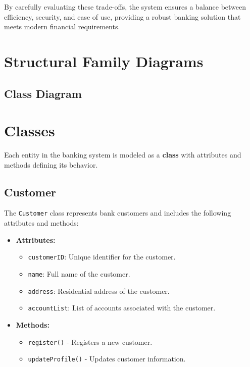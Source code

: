 By carefully evaluating these trade-offs, the system ensures a balance
between efficiency, security, and ease of use, providing a robust
banking solution that meets modern financial requirements.

\section{\texorpdfstring{Structural Family Diagrams
}{Structural Family Diagrams }}\label{structural-family-diagrams}

\subsection{Class Diagram}\label{class-diagram}

\section{\texorpdfstring{ Classes}{ Classes}}\label{classes}

Each entity in the banking system is modeled as a \textbf{class} with
attributes and methods defining its behavior.

\subsection{Customer}\label{customer}

The \texttt{Customer} class represents bank customers and includes the
following attributes and methods:

\begin{itemize}
\item
  \textbf{Attributes:}

  \begin{itemize}
  \item
    \texttt{customerID}: Unique identifier for the customer.
  \item
    \texttt{name}: Full name of the customer.
  \item
    \texttt{address}: Residential address of the customer.
  \item
    \texttt{accountList}: List of accounts associated with the customer.
  \end{itemize}
\item
  \textbf{Methods:}

  \begin{itemize}
  \item
    \texttt{register(}\texttt{)} - Registers a new customer.
  \item
    \texttt{updateProfile}\texttt{(}\texttt{)} - Updates customer
    information.
  \end{itemize}
\end{itemize}


